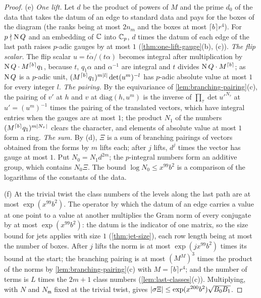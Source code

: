 \begin{proof}
(e) \emph{One lift.} Let $d$ be the product of powers of $M$ and the prime $d_0$ of the data that takes the datum of an edge to standard data and pays for the boxes of the diagram (the ranks being at most $2n_m$ and the boxes at most
$\lceil b\rceil r^4$). For $p\nmid\operatorname{N} Q$ and an embedding of $\mathbb{C}$ into $\mathbb{C}_p$, $d$ times the datum of each edge of the last path raises $p$-adic gauges by at most $1$ (\cref{thm:one-lift-gauge}(b), (c)). \emph{The flip scalar.} The flip scalar
$u=\overline{t\alpha}/(t\alpha)$ becomes integral after multiplication by $\operatorname{N} Q\cdot M^{\lceil b\rceil}q_1$, because $t$, $q_1\alpha$ and $\alpha^{-1}$ are integral and $t$ divides $\operatorname{N} Q\cdot M^{\lceil b\rceil}$; as $\operatorname{N} Q$ is a $p$-adic unit,
$(M^{\lceil b\rceil}q_1)^{m\lvert l\rvert}\det(u^m)^{-l}$ has $p$-adic absolute value at most $1$ for every integer $l$. \emph{The pairing.} By the equivariance of \cref{lem:branching-pairing}(c), the pairing of $v'$ at $h$ and $v$ at $\mathrm{diag}(h,u^m)$ is the
inverse of $\prod_\tau\det u'^{N_\tau}$ at $u'=(u^m)^{-1}$ times the pairing of the translated vectors, which have integral entries when the gauges are at most $1$; the product $N_1$ of the numbers $(M^{\lceil b\rceil}q_1)^{m\lvert N_\tau\rvert}$ clears the
character, and elements of absolute value at most $1$ form a ring. \emph{The sum.} By (d), $\Xi$ is a sum of branching pairings of vectors obtained from the forms by $m$ lifts each; after $j$ lifts, $d^j$ times the vector has gauge at most
$1$. Put $N_0=N_1d^{2m}$; the $p$-integral numbers form an additive group, which contains $N_0\Xi$. The bound $\log N_0\le x^{99}b^2$ is a comparison of the logarithms of the constants of the data.

(f) At the trivial twist the class numbers of the levels along the last path are at most $\exp(x^{99}b^2)$. The operator by which the datum of an edge carries a value at one point to a value at another multiplies the Gram norm of
every conjugate by at most $\exp(x^{99}b^2)$: the datum is the indicator of one matrix, so the size bound for jets applies with size $1$ (\cref{thm:jet-size}), each row length being at most the number of boxes. After $j$ lifts the norm
is at most $\exp(jx^{99}b^2)$ times its bound at the start; the branching pairing is at most $(M^M)^3$ times the product of the norms by \cref{lem:branching-pairing}(c) with $M=\lceil b\rceil r^4$; and the number of terms is $L$ times the
$2m+1$ class numbers (\cref{lem:last-classes}(c)). Multiplying, with $N$ and $N_{\mathfrak m}$ fixed at the trivial twist, gives $\lvert \sigma\Xi\rvert\le\exp(x^{200}b^2)\sqrt{B_0B_1}$.
\end{proof}

